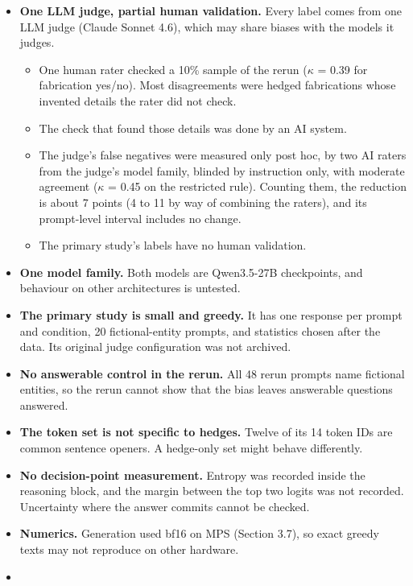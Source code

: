 \documentclass[11pt,letterpaper]{article}
\providecommand{\tightlist}{\setlength{\itemsep}{0pt}\setlength{\parskip}{0pt}}
\DeclareRobustCommand{\_}{\textunderscore\allowbreak}
\begin{document}
\begin{itemize}
\tightlist
\item
  \textbf{One LLM judge, partial human validation.} Every label comes from one LLM judge (Claude Sonnet 4.6), which may share biases with the models it judges.

  \begin{itemize}
  \tightlist
  \item
    One human rater checked a 10\% sample of the rerun (\(\kappa\) = 0.39 for fabrication yes/no). Most disagreements were hedged fabrications whose invented details the rater did not check.
  \item
    The check that found those details was done by an AI system.
  \item
    The judge's false negatives were measured only post hoc, by two AI raters from the judge's model family, blinded by instruction only, with moderate agreement (\(\kappa\) = 0.45 on the restricted rule). Counting them, the reduction is about 7 points (4 to 11 by way of combining the raters), and its prompt-level interval includes no change.
  \item
    The primary study's labels have no human validation.
  \end{itemize}
\item
  \textbf{One model family.} Both models are Qwen3.5-27B checkpoints, and behaviour on other architectures is untested.
\item
  \textbf{The primary study is small and greedy.} It has one response per prompt and condition, 20 fictional-entity prompts, and statistics chosen after the data. Its original judge configuration was not archived.
\item
  \textbf{No answerable control in the rerun.} All 48 rerun prompts name fictional entities, so the rerun cannot show that the bias leaves answerable questions answered.
\item
  \textbf{The token set is not specific to hedges.} Twelve of its 14 token IDs are common sentence openers. A hedge-only set might behave differently.
\item
  \textbf{No decision-point measurement.} Entropy was recorded inside the reasoning block, and the margin between the top two logits was not recorded. Uncertainty where the answer commits cannot be checked.
\item
  \textbf{Numerics.} Generation used bf16 on MPS (Section 3.7), so exact greedy texts may not reproduce on other hardware.
\item

\end{itemize}
\end{document}
